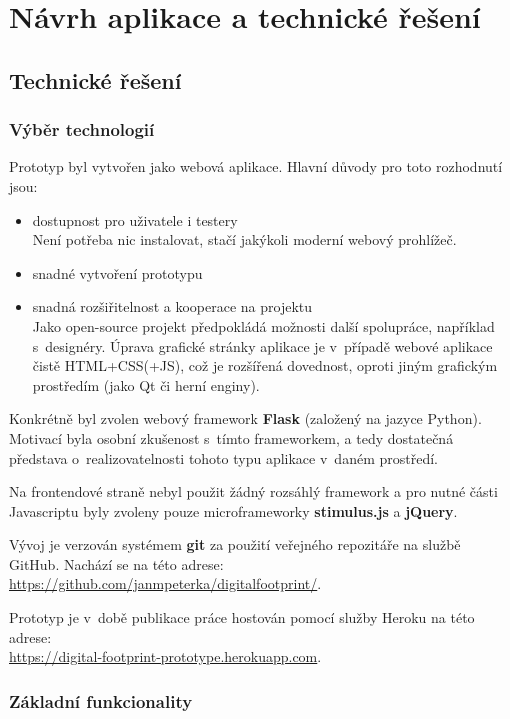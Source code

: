 \chapter{Návrh aplikace a technické řešení}

\section{Technické řešení}
\subsection{Výběr technologií}
Prototyp byl vytvořen jako webová aplikace.
Hlavní důvody pro toto rozhodnutí jsou:
\begin{itemize}
	\item dostupnost pro uživatele i testery\\
	Není potřeba nic instalovat, stačí jakýkoli moderní webový prohlížeč.
	\item snadné vytvoření prototypu
	\item snadná rozšiřitelnost a kooperace na projektu\\ Jako open-source projekt předpokládá možnosti další spolupráce, například s~designéry. Úprava grafické stránky aplikace je v~případě webové aplikace čistě HTML+CSS(+JS), což je rozšířená dovednost, oproti jiným grafickým prostředím (jako Qt či herní enginy).
\end{itemize}

Konkrétně byl zvolen webový framework \textbf{Flask} (založený na jazyce Python). Motivací byla osobní zkušenost s~tímto frameworkem, a tedy dostatečná představa o~realizovatelnosti tohoto typu aplikace v~daném prostředí.

Na frontendové straně nebyl použit žádný rozsáhlý framework a pro nutné části Javascriptu byly zvoleny pouze microframeworky \textbf{stimulus.js} a \textbf{jQuery}.

Vývoj je verzován systémem \textbf{git} za použití veřejného repozitáře na službě GitHub. Nachází se na této adrese:\\
\url{https://github.com/janmpeterka/digitalfootprint/}.

Prototyp je v~době publikace práce hostován pomocí služby Heroku na této adrese:\\
\url{https://digital-footprint-prototype.herokuapp.com}.

\subsection{Základní funkcionality}
